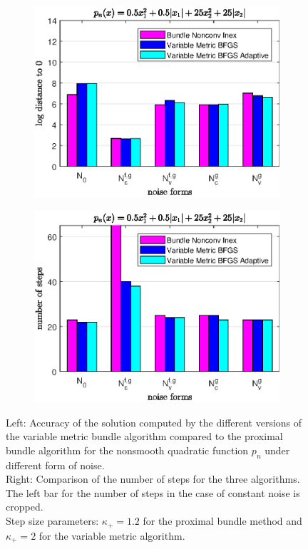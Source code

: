 \begin{figure}[ht]
	\begin{subfigure}[t]{0.49\textwidth}
		\includegraphics[width=\textwidth]{Pictures/Plots/accuracy_bar_nonsm_parab_u_1-2.eps}
	\end{subfigure}
	\begin{subfigure}[t]{0.49\textwidth}
			\includegraphics[width=\textwidth]{Pictures/Plots/steps_bar_nonsm_parab_u_1-2.eps}
	\end{subfigure}
	\caption[Accuracy and number of steps for a nonsmooth quadratic]{Left: Accuracy of the solution computed by the different versions of the variable metric bundle algorithm compared to the proximal bundle algorithm for the nonsmooth quadratic function \(p_n\) under different form of noise.\\
	Right: Comparison of the number of steps for the three algorithms. The left bar for the number of steps in the case of constant noise is cropped.\\
	Step size parameters: \(\kappa_+ = 1.2\) for the proximal bundle method and \(\kappa_+ = 2\) for the variable metric algorithm.}
	\label{fig_bar_nonsm_parab}
\end{figure}

